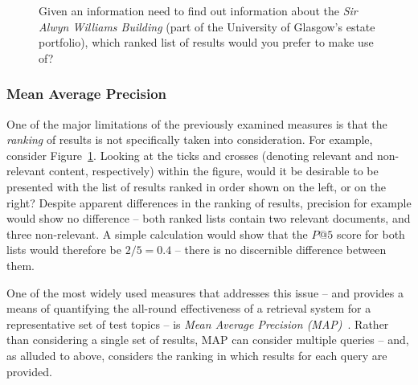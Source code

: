 \begin{figure}[t!]
    \centering
    \caption[The importance of ranking]{Given an information need to find out information about the \emph{Sir Alwyn Williams Building} (part of the University of Glasgow's estate portfolio), which ranked list of results would you prefer to make use of?}
    \label{fig:ranking}
\end{figure}

\subsubsection{Mean Average Precision}
One of the major limitations of the previously examined measures is that the \emph{ranking} of results is not specifically taken into consideration. For example, consider Figure~\ref{fig:ranking}. Looking at the {\color{dmax_green}ticks} and {\color{dmax_red}crosses} (denoting relevant and non-relevant content, respectively) within the figure, would it be desirable to be presented with the list of results ranked in order shown on the left, or on the right? Despite apparent differences in the ranking of results, precision for example would show no difference -- both ranked lists contain two relevant documents, and three non-relevant. A simple calculation would show that the $P@5$ score for both lists would therefore be $2 / 5 = 0.4$ -- there is no discernible difference between them.

One of the most widely used measures that addresses this issue -- and provides a means of quantifying the all-round effectiveness of a retrieval system for a representative set of test topics -- is \emph{Mean Average Precision (MAP)}~\cite{voorhees2005trec_book}. Rather than considering a single set of results, MAP can consider multiple queries -- and, as alluded to above, considers the ranking in which results for each query are provided.

